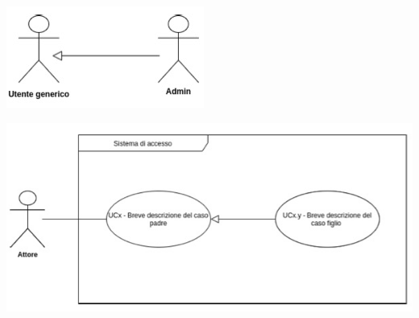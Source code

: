 \begin{itemize}
	\begin{center}
		\begin{minipage}{0.4\textwidth}
			\centering
			\includegraphics[scale=0.4]{Immagini/UML/GeneralizzazioneAttori}
		\end{minipage}
		\begin{minipage}{0.5\textwidth}
			\centering
			\includegraphics[scale=0.4]{Immagini/UML/GeneralizzazioneUC}
	\end{minipage}
	\end{center}
\end{itemize} 



